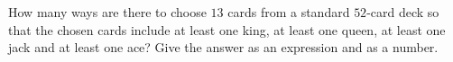 How many ways are there to choose $13$ cards from a standard $52$-card deck so that the chosen cards include at least one king, at least one queen, at least one jack and at least one ace? Give the answer as an expression and as a number.

